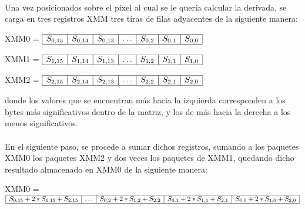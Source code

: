 \documentclass[11pt, a4paper]{article}
\begin{document}
\paragraph{}
Una vez posicionados sobre el pixel al cual se le quer\'ia calcular la derivada, se carga en tres registros XMM tres tiras de filas adyacentes de la siguiente manera:\\

\begin{center}
XMM0 = $\begin{array}{|c|c|c|c|c|c|c|}
\hline
S_{0,15} & S_{0,14} & S_{0,13} & \ldots & S_{0,2} & S_{0,1} & S_{0,0}\\
\hline
\end{array} $
\end{center}


\begin{center}
XMM1 = $\begin{array}{|c|c|c|c|c|c|c|}
\hline
S_{1,15} & S_{1,14} & S_{1,13} & \ldots & S_{1,2} & S_{1,1} & S_{1,0}\\
\hline
\end{array} $
\end{center}

\begin{center}
XMM2 = $\begin{array}{|c|c|c|c|c|c|c|}
\hline
S_{2,15} & S_{2,14} & S_{2,13} & \ldots & S_{2,2} & S_{2,1} & S_{2,0}\\
\hline
\end{array} $
\end{center}

donde los valores que se encuentran m\'as hacia la izquierda corresponden a los bytes m\'as significativos dentro de la matriz, y los de m\'as hacia la derecha a los menos significativos.

\paragraph{}
En el siguiente paso, se procede a sumar dichos registros, sumando a los paquetes XMM0 los paquetes XMM2 y dos veces los paquetes de XMM1, quedando dicho resultado almacenado en XMM0 de la siguiente manera:

\begin{center}
XMM0 = $\begin{array}{|c|c|c|c|c|}
\hline
S_{0,15} + 2*S_{1,15} + S_{2,15} & \ldots & S_{0,2} + 2*S_{1,2} + S_{2,2} & S_{0,1} + 2*S_{1,1} + S_{2,1} & S_{0,0} + 2*S_{1,0} + S_{2,0}\\
\hline
\end{array} $
\end{center}
\end{document}
